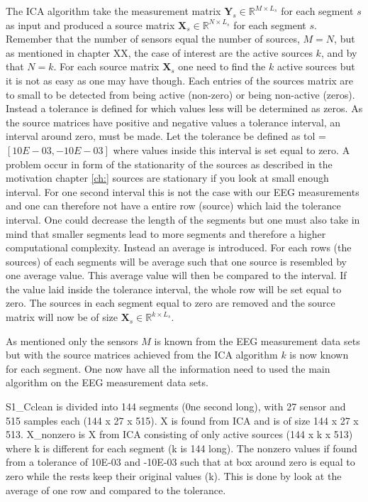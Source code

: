 The ICA algorithm take the measurement matrix $\mathbf{Y}_s \in \mathbb{R}^{M \times L_s}$ for each segment $s$ as input and produced a source matrix $\mathbf{X}_s \in \mathbb{R}^{N \times L_s}$ for each segment $s$. Remember that the number of sensors equal the number of sources, $M = N$, but as mentioned in chapter XX, the case of interest are the active sources $k$, and by that $N = k$. 
For each source matrix $\mathbf{X}_s$ one need to find the $k$ active sources but it is not as easy as one may have though. Each entries of the sources matrix are to small to be detected from being active (non-zero) or being non-active (zeros).
Instead a tolerance is defined for which values less will be determined as zeros. As the source matrices have positive and negative values a tolerance interval, an interval around zero, must be made. Let the tolerance be defined as tol = $[10E-03, -10E-03]$ where values inside this interval is set equal to zero.
A problem occur in form of the stationarity of the sources as described in the motivation chapter \ref{ch:} sources are stationary if you look at small enough interval. For one second interval this is not the case with our EEG measurements and one can therefore not have a entire row (source) which laid the tolerance interval. One could decrease the length of the segments but one must also take in mind that smaller segments lead to more segments and therefore a higher computational complexity. Instead an average is introduced. For each rows (the sources) of each segments will be average such that one source is resembled by one average value. This average value will then be compared to the interval. If the value laid inside the tolerance interval, the whole row will be set equal to zero. The sources in each segment equal to zero are removed and the source matrix will now be of size $\mathbf{X}_s \in \mathbb{R}^{k \times L_s}$.

As mentioned only the sensors $M$ is known from the EEG measurement data sets but with the source matrices achieved from the ICA algorithm $k$ is now known for each segment. One now have all the information need to used the main algorithm on the EEG measurement data sets. 

S1\_Cclean is divided into 144 segments (0ne second long), with 27 sensor and 515 samples each (144 x 27 x 515).  X is found from ICA and is of size 144 x 27 x 513. X\_nonzero is X from ICA consisting of only active sources (144 x k x 513) where k is different for each segment (k is 144 long). The nonzero values if found from a tolerance of 10E-03 and -10E-03 such that at box around zero is equal to zero while the rests keep their original values (k). This is done by look at the average of one row and compared to the tolerance.

